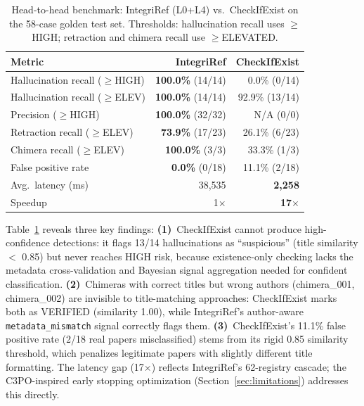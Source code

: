 \documentclass[sigconf,nonacm]{acmart}
\begin{document}
\begin{table}[t]
\caption{Head-to-head benchmark: IntegriRef (L0+L4) vs.\ CheckIfExist on the 58-case golden test set. Thresholds: hallucination recall uses $\geq$HIGH; retraction and chimera recall use $\geq$ELEVATED.}
\label{tab:headtohead}
\centering
\small
\begin{tabular}{lrr}
\toprule
\textbf{Metric} & \textbf{IntegriRef} & \textbf{CheckIfExist} \\
\midrule
Hallucination recall ($\geq$HIGH)    & \textbf{100.0\%} (14/14) & 0.0\% (0/14) \\
Hallucination recall ($\geq$ELEV)    & \textbf{100.0\%} (14/14) & 92.9\% (13/14) \\
Precision ($\geq$HIGH)               & \textbf{100.0\%} (32/32) & N/A (0/0) \\
Retraction recall ($\geq$ELEV)       & \textbf{73.9\%} (17/23)  & 26.1\% (6/23) \\
Chimera recall ($\geq$ELEV)          & \textbf{100.0\%} (3/3)   & 33.3\% (1/3) \\
False positive rate                  & \textbf{0.0\%} (0/18)    & 11.1\% (2/18) \\
\midrule
Avg.\ latency (ms)                   & 38,535   & \textbf{2,258} \\
Speedup                              & 1$\times$ & \textbf{17$\times$} \\
\bottomrule
\end{tabular}
\end{table}

Table~\ref{tab:headtohead} reveals three key findings:
\textbf{(1)}~CheckIfExist cannot produce high-confidence detections: it flags 13/14 hallucinations as ``suspicious'' (title similarity $<$ 0.85) but never reaches HIGH risk, because existence-only checking lacks the metadata cross-validation and Bayesian signal aggregation needed for confident classification.
\textbf{(2)}~Chimeras with correct titles but wrong authors (chimera\_001, chimera\_002) are invisible to title-matching approaches: CheckIfExist marks both as VERIFIED (similarity 1.00), while IntegriRef's author-aware \texttt{metadata\_mismatch} signal correctly flags them.
\textbf{(3)}~CheckIfExist's 11.1\% false positive rate (2/18 real papers misclassified) stems from its rigid 0.85 similarity threshold, which penalizes legitimate papers with slightly different title formatting.
The latency gap (17$\times$) reflects IntegriRef's 62-registry cascade; the C3PO-inspired early stopping optimization (Section~\ref{sec:limitations}) addresses this directly.
\end{document}
